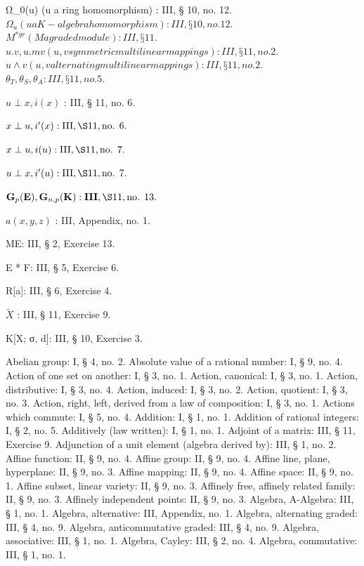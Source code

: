 Ω_{0}(u) (u a ring homomorphism) : III, § 10, no. 12.\) \(Ω_{u} (u a K-algebra homomorphism) : III, § 10, no. 12.\) \(M^{*gr} (M a graded module) : III, § 11.\) \(u.v, u.mv (u,v symmetric multilinear mappings) : III, § 11, no. 2.\) \(u \wedge v (u,v alternating multilinear mappings) : III, § 11, no. 2.\) \(θ_{T}, θ_{S}, θ_{A} : III, § 11, no. 5.\)

\(u \perp x, i(x)\) : III, § 11, no. 6.

\(x \perp u, i'(x): \text{III}, \S 11, \text{no. } 6.\)

\(x \perp u, i(u): \text{III}, \S 11, \text{no. } 7.\)

\(u \perp x, i'(u): \text{III}, \S 11, \text{no. } 7.\)

\(\mathbf{G}_p(\mathbf{E}), \mathbf{G}_{n,p}(\mathbf{K}) : \mathbf{III}, \S 11, \text{no. } 13.\)

\(a(x,y,z)\) : III, Appendix, no. 1.

ME: III, § 2, Exercise 13.

E * F: III, § 5, Exercise 6.

R{[}a{]}: III, § 6, Exercise 4.

\(\tilde{X}\) : III, § 11, Exercise 9.

K{[}X; σ, d{]}: III, § 10, Exercise 3.


Abelian group: I, § 4, no. 2. Absolute value of a rational number: I, § 9, no. 4. Action of one set on another: I, § 3, no. 1. Action, canonical: I, § 3, no. 1. Action, distributive: I, § 3, no. 4. Action, induced: I, § 3, no. 2. Action, quotient: I, § 3, no. 3. Action, right, left, derived from a law of composition: I, § 3, no. 1. Actions which commute: I, § 5, no. 4. Addition: I, § 1, no. 1. Addition of rational integers: I, § 2, no. 5. Additively (law written): I, § 1, no. 1. Adjoint of a matrix: III, § 11, Exercise 9. Adjunction of a unit element (algebra derived by): III, § 1, no. 2. Affine function: II, § 9, no. 4. Affine group: II, § 9, no. 4. Affine line, plane, hyperplane: II, § 9, no. 3. Affine mapping: II, § 9, no. 4. Affine space: II, § 9, no. 1. Affine subset, linear variety: II, § 9, no. 3. Affinely free, affinely related family: II, § 9, no. 3. Affinely independent points: II, § 9, no. 3. Algebra, A-Algebra: III, § 1, no. 1. Algebra, alternative: III, Appendix, no. 1. Algebra, alternating graded: III, § 4, no. 9. Algebra, anticommutative graded: III, § 4, no. 9. Algebra, associative: III, § 1, no. 1. Algebra, Cayley: III, § 2, no. 4. Algebra, commutative: III, § 1, no. 1.


